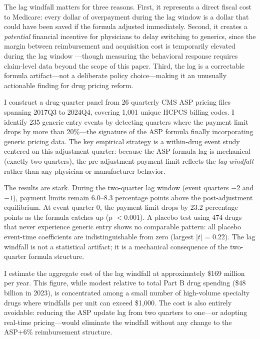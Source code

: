 \documentclass[12pt]{article}
\begin{document}
The lag windfall matters for three reasons. First, it represents a direct fiscal cost to Medicare: every dollar of overpayment during the lag window is a dollar that could have been saved if the formula adjusted immediately. Second, it creates a \textit{potential} financial incentive for physicians to delay switching to generics, since the margin between reimbursement and acquisition cost is temporarily elevated during the lag window \citep{jacobson2006}---though measuring the behavioral response requires claim-level data beyond the scope of this paper. Third, the lag is a correctable formula artifact---not a deliberate policy choice---making it an unusually actionable finding for drug pricing reform.

I construct a drug-quarter panel from 26 quarterly CMS ASP pricing files spanning 2017Q3 to 2024Q4, covering 1,001 unique HCPCS billing codes. I identify 235 generic entry events by detecting quarters where the payment limit drops by more than 20\%---the signature of the ASP formula finally incorporating generic pricing data. The key empirical strategy is a within-drug event study centered on this adjustment quarter: because the ASP formula lag is mechanical (exactly two quarters), the pre-adjustment payment limit reflects the \textit{lag windfall} rather than any physician or manufacturer behavior.

The results are stark. During the two-quarter lag window (event quarters $-2$ and $-1$), payment limits remain 6.0--8.3 percentage points above the post-adjustment equilibrium. At event quarter 0, the payment limit drops by 23.2 percentage points as the formula catches up (p $< 0.001$). A placebo test using 474 drugs that never experience generic entry shows no comparable pattern: all placebo event-time coefficients are indistinguishable from zero (largest $|t|$ = 0.22). The lag windfall is not a statistical artifact; it is a mechanical consequence of the two-quarter formula structure.

I estimate the aggregate cost of the lag windfall at approximately \$169 million per year. This figure, while modest relative to total Part B drug spending (\$48 billion in 2023), is concentrated among a small number of high-volume specialty drugs where windfalls per unit can exceed \$1,000. The cost is also entirely avoidable: reducing the ASP update lag from two quarters to one---or adopting real-time pricing---would eliminate the windfall without any change to the ASP+6\% reimbursement structure.
\end{document}
